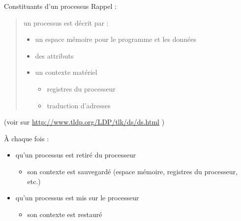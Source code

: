 \def\inc{inc2-ps}




\begin {frame} {Constituants d'un processus}
    Rappel :

    \begin {quote}
	un processus est décrit par :
	\begin {itemize}
	    \fB
	    \item un espace mémoire pour le programme et les données
	    \item des attributs
	    \item un contexte matériel
		\begin {itemize}
		    \fC
		    \item registres du processeur
		    \item traduction d'adresses
		\end {itemize}
	\end {itemize}
    \end {quote}

    { \fB (voir  sur
	\url {http://www.tldp.org/LDP/tlk/ds/ds.html} )}

    \vspace* {2mm}

    À chaque fois :
    \begin {itemize}
	\fB
	\item qu'un processus est retiré du processeur
	    \begin {itemize}
		\fC
		\item son contexte est sauvegardé (espace mémoire, registres
		    du processeur, etc.)
	    \end {itemize}
	\item qu'un processus est mis sur le processeur
	    \begin {itemize}
		\fC
		\item son contexte est restauré
	    \end {itemize}
    \end {itemize}
\end {frame}

